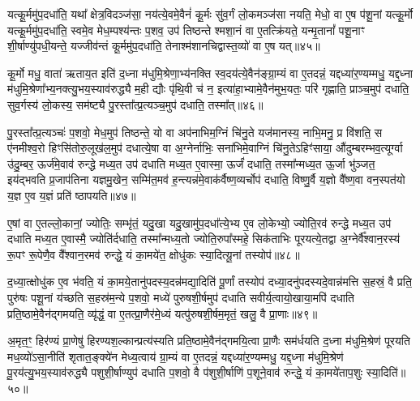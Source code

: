 यत्कू॒र्ममु॑प॒दधा॑ति॒ यथा᳚ क्षेत्र॒विदञ्ज॑सा॒ नय॑त्ये॒वमे॒वैनं॑ कू॒र्मः सु॑व॒र्गं लो॒कमञ्ज॑सा नयति॒ मेधो॒ वा ए॒ष प॑शू॒नां यत्कू॒र्मो यत्कू॒र्ममु॑प॒दधा॑ति॒ स्वमे॒व मेध॒म्पश्य॑न्तः प॒शव॒ उप॑ तिष्ठन्ते श्मशा॒नं वा ए॒तत्क्रि॑यते॒ यन्मृ॒तानां᳚ पशू॒नाꣳ शी॒र्\mbox{}षाण्यु॑पधी॒यन्ते॒ यज्जीव॑न्तं कू॒र्ममु॑प॒दधा॑ति॒ तेनाश्म॑शानचिद्वास्त॒व्यो॑ वा ए॒ष यत्॥४५॥

कू॒र्मो मधु॒ वाता॑ ऋताय॒त इति॑ द॒ध्ना म॑धुमि॒श्रेणा॒भ्य॑नक्ति स्व॒दय॑त्ये॒वैन॑ङ्ग्रा॒म्यं वा ए॒तदन्नं॒ यद्दध्या॑र॒ण्यम्मधु॒ यद्द॒ध्ना म॑धुमि॒श्रेणा᳚भ्य॒नक्त्यु॒भय॒स्याव॑रुद्ध्यै म॒ही द्यौः पृ॑थि॒वी च॑ न॒ इत्या॑हा॒भ्यामे॒वैन॑मुभ॒यतः॒ परि॑ गृह्णाति॒ प्राञ्च॒मुप॑ दधाति॒ सुव॒र्गस्य॑ लो॒कस्य॒ सम॑ष्ट्यै पु॒रस्ता᳚त्प्र॒त्यञ्च॒मुप॑ दधाति॒ तस्मा᳚त्॥४६॥

पु॒रस्ता᳚त्प्र॒त्यञ्चः॑ प॒शवो॒ मेध॒मुप॑ तिष्ठन्ते॒ यो वा अप॑नाभिम॒ग्निं चि॑नु॒ते यज॑मानस्य॒ नाभि॒मनु॒ प्र वि॑शति॒ स ए॑नमीश्व॒रो हिꣳसि॑तोरु॒लूख॑ल॒मुप॑ दधात्ये॒षा वा अ॒ग्नेर्नाभिः॒ सना॑भिमे॒वाग्निं चि॑नु॒ते\-ऽहिꣳ॑साया॒ औ॑दुम्बरम्भव॒त्यूर्ग्वा उ॑दु॒म्बर॒ ऊर्ज॑मे॒वाव॑ रुन्द्धे मध्य॒त उप॑ दधाति मध्य॒त ए॒वास्मा॒ ऊर्जं॑ दधाति॒ तस्मा᳚न्मध्य॒त ऊ॒र्जा भु॑ञ्जत॒ इय॑द्भवति प्र॒जाप॑तिना यज्ञमु॒खेन॒ सम्मि॑त॒मव॑ ह॒न्त्यन्न॑मे॒वाक॑र्वैष्ण॒व्यर्चोप॑ दधाति॒ विष्णु॒र्वै य॒ज्ञो वै᳚ष्ण॒वा वन॒स्पत॑यो य॒ज्ञ ए॒व य॒ज्ञं प्रति॑ ष्ठापयति॥४७॥

{\anuvakamend[{ए॒ष वै प॒शुर्यम॑सर्पदे॒ष यत्तस्मा॒त्तस्मा᳚थ्स॒प्तविꣳ॑शतिश्च॥८॥}]}

ए॒षां वा ए॒तल्लो॒कानां॒ ज्योतिः॒ सम्भृ॑तं॒ यदु॒खा यदु॒खामु॑प॒दधा᳚त्ये॒भ्य ए॒व लो॒केभ्यो॒ ज्योति॒रव॑ रुन्द्धे मध्य॒त उप॑ दधाति मध्य॒त ए॒वास्मै॒ ज्योति॑र्दधाति॒ तस्मा᳚न्मध्य॒तो ज्योति॒रुपा᳚स्महे॒ सिक॑ताभिः पूरयत्ये॒तद्वा अ॒ग्नेर्वै᳚श्वान॒रस्य॑ रू॒पꣳ रू॒पेणै॒व वै᳚श्वान॒रमव॑ रुन्द्धे॒ यं का॒मये॑त॒ क्षोधु॑कः स्या॒दित्यू॒नां तस्योप॑॥४८॥

द॒ध्या॒त्क्षोधु॑क ए॒व भ॑वति॒ यं का॒मये॒तानु॑पदस्य॒दन्न॑मद्या॒दिति॑ पू॒र्णां तस्योप॑ दध्या॒दनु॑पदस्यदे॒वान्न॑मत्ति स॒हस्रं॒ वै प्रति॒ पुरु॑षः पशू॒नां य॑च्छति स॒हस्र॑म॒न्ये प॒शवो॒ मध्ये॑ पुरुषशी॒र्\mbox{}षमुप॑ दधाति सवीर्य॒त्वायो॒खाया॒मपि॑ दधाति प्रति॒ष्ठामे॒वैन॑द्गमयति॒ व्यृ॑द्धं॒ वा ए॒तत्प्रा॒णैर॑मे॒ध्यं यत्पु॑रुषशी॒र्\mbox{}षम॒मृतं॒ खलु॒ वै प्रा॒णाः॥४९॥

अ॒मृत॒ꣳ॒ हिर॑ण्यं प्रा॒णेषु॑ हिरण्यश॒ल्कान्प्रत्य॑स्यति प्रति॒ष्ठामे॒वैन॑द्गमयि॒त्वा प्रा॒णैः सम॑र्धयति द॒ध्ना म॑धुमि॒श्रेण॑ पूरयति मध॒व्यो॑\-ऽसा॒नीति॑ शृतात॒ङ्क्ये॑न मेध्य॒त्वाय॑ ग्रा॒म्यं वा ए॒तदन्नं॒ यद्दध्या॑र॒ण्यम्मधु॒ यद्द॒ध्ना म॑धुमि॒श्रेण॑ पू॒रय॑त्यु॒भय॒स्याव॑रुद्ध्यै पशुशी॒र्\mbox{}षाण्युप॑ दधाति प॒शवो॒ वै प॑शुशी॒र्\mbox{}षाणि॑ प॒शूने॒वाव॑ रुन्द्धे॒ यं का॒मये॑ताप॒शुः स्या॒दिति॑॥५०॥

